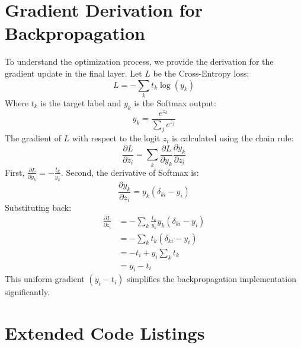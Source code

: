 \documentclass[11pt, a4paper]{article}
\begin{document}
\section{Gradient Derivation for Backpropagation}
To understand the optimization process, we provide the derivation for the gradient update in the final layer. Let $L$ be the Cross-Entropy loss:
\begin{equation}
L = - \sum_{k} t_k \log(y_k)
\end{equation}
Where $t_k$ is the target label and $y_k$ is the Softmax output:
\begin{equation}
y_k = \frac{e^{z_k}}{\sum_{j} e^{z_j}}
\end{equation}
The gradient of $L$ with respect to the logit $z_i$ is calculated using the chain rule:
\begin{equation}
\frac{\partial L}{\partial z_i} = \sum_{k} \frac{\partial L}{\partial y_k} \frac{\partial y_k}{\partial z_i}
\end{equation}
First, $\frac{\partial L}{\partial y_k} = -\frac{t_k}{y_k}$.
Second, the derivative of Softmax is:
\begin{equation}
\frac{\partial y_k}{\partial z_i} = y_k (\delta_{ki} - y_i)
\end{equation}
Substituting back:
\begin{align}
\frac{\partial L}{\partial z_i} &= - \sum_{k} \frac{t_k}{y_k} y_k (\delta_{ki} - y_i) \\
&= - \sum_{k} t_k (\delta_{ki} - y_i) \\
&= - t_i + y_i \sum_{k} t_k \\
&= y_i - t_i
\end{align}
This uniform gradient $(y_i - t_i)$ simplifies the backpropagation implementation significantly.

\section{Extended Code Listings}
\end{document}
